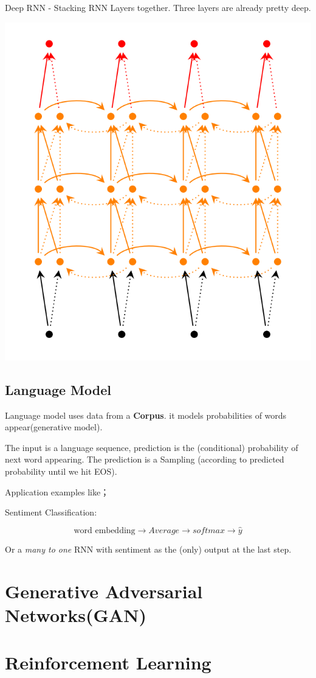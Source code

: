 \documentclass[11pt, openany]{book}              %
\begin{document}
Deep RNN - Stacking RNN Layers together. Three layers are already pretty deep.

\includegraphics[width=15cm]{DeepRNN.png}

\section{Language Model}

Language model uses data from a \textbf{Corpus}. it models probabilities of words appear(generative model).

The input is a language sequence, prediction is the (conditional) probability of next word appearing. The prediction is a Sampling (according to predicted probability until we hit EOS).

Application examples like；

Sentiment Classification:

$$\text{word embedding} \rightarrow Average \rightarrow softmax \rightarrow \hat{y}$$

Or a \textit{many to one} RNN with sentiment as the (only) output at the last step.

\chapter{Generative Adversarial Networks(GAN)}
	
\chapter{Reinforcement Learning}
 
\end{document}
